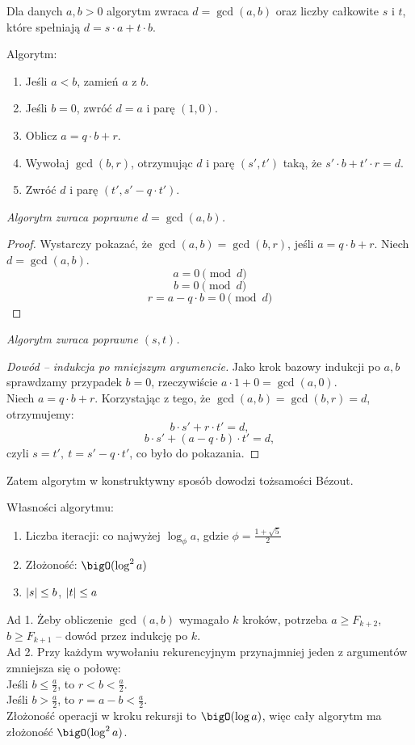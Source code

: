 Dla danych \( a, b > 0 \) algorytm zwraca \( d = \gcd(a,b) \) oraz liczby całkowite \( s \) i \( t \), które spełniają \( d = s\cdot a + t\cdot b \).

\begin{greyframe}
    Algorytm:
    \begin{enumerate}
        \item Jeśli \( a < b \), zamień \( a \) z \( b \).
        \item Jeśli \( b = 0 \), zwróć \( d = a \) i parę \( (1,0) \).
        \item Oblicz \( a = q \cdot b + r \).
        \item Wywołaj \( \gcd(b,r) \), otrzymując \( d \) i parę \( (s', t') \) taką, że \( s'\cdot b + t' \cdot r = d \).
        \item Zwróć \( d \) i parę \( (t', s' - q \cdot t') \).
    \end{enumerate}
\end{greyframe}

\vspace{1em}\noindent
\textit{Algorytm zwraca poprawne \( d = \gcd(a, b) \).}
\begin{proof}
    Wystarczy pokazać, że \( \gcd(a, b) = \gcd(b, r) \), jeśli \( a = q \cdot b + r \). Niech \( d = \gcd(a, b) \).
    \[
        a = 0 \pmod{d}
    \]
    \[
        b = 0 \pmod{d}
    \]
    \[
        r = a - q \cdot b = 0 \pmod{d}
    \]
\end{proof}
\textit{Algorytm zwraca poprawne \( (s, t) \).}
\begin{proof}[Dowód -- indukcja po mniejszym argumencie]
    Jako krok bazowy indukcji po \( a, b \) sprawdzamy przypadek \( b = 0 \), rzeczywiście \( a \cdot 1 + 0 = \gcd(a, 0) \). \\
    Niech \( a = q \cdot b + r \). Korzystając z tego, że \( \gcd(a, b) = \gcd(b, r) = d \), otrzymujemy:
    \[
        b \cdot s' + r \cdot t' = d,
    \]
    \[
        b \cdot s' + (a - q \cdot b) \cdot t' = d,
    \]
    czyli \( s = t', \ t = s' - q \cdot t' \), co było do pokazania.
\end{proof}
Zatem algorytm w konstruktywny sposób dowodzi tożsamości B\'ezout.

Własności algorytmu:
\begin{enumerate}
    \item Liczba iteracji: co najwyżej \( \log_{\phi} a \), gdzie \( \phi = \frac{1 + \sqrt{5}}{2} \)
    \item Złożoność: \( \bigO(\log^2 a) \)
    \item \( \left\lvert s\right\rvert \leq b \), \( \left\lvert t\right\rvert \leq a \)
\end{enumerate}
Ad 1. Żeby obliczenie \( \gcd(a, b) \) wymagało \( k \) kroków, potrzeba \( a \geq F_{k+2} \), \( b \geq F_{k+1} \) -- dowód przez indukcję po \( k \). \\
Ad 2. Przy każdym wywołaniu rekurencyjnym przynajmniej jeden z argumentów zmniejsza się o połowę: \\
Jeśli \( b \leq \frac{a}{2} \), to \( r < b < \frac{a}{2} \). \\
Jeśli \( b > \frac{a}{2} \), to \( r = a - b < \frac{a}{2} \). \\
Złożoność operacji w kroku rekursji  to \( \bigO(\log a) \), więc cały algorytm ma złożoność \( \bigO(\log^2 a) \).